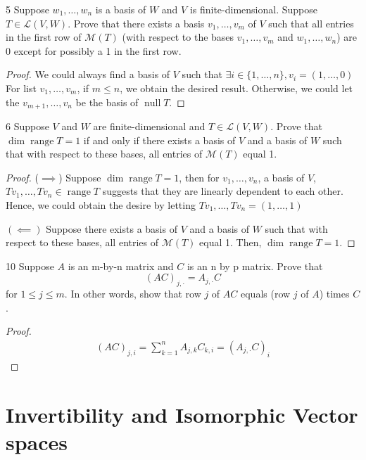 \documentclass{article}
\newenvironment{problem}[1]{\begin{prob*}{#1}{}}{\end{prob*}}
\DeclareMathOperator{\Null}{null}
\DeclareMathOperator{\Range}{range}
\begin{document}
\begin{problem}{5}
Suppose $w_1, \ldots ,w_n$ is a basis of $W$ and $V$ is finite-dimensional. Suppose $T \in \mathcal{L}(V,W)$. Prove that there exists a basis $v_1, \ldots ,v_m$ of $V$ such that all entries in the first row of $\mathcal{M}(T)$ (with respect to the bases $v_1, \ldots ,v_m$ and $w_1, \ldots ,w_n$) are 0 except for possibly a 1 in the first row.
\end{problem}
\begin{proof}
	We could always find a basis of $V$ such that $\exists i \in \{1, \ldots ,n\}, v_i = (1, \ldots ,0)$
	For list $v_1, \ldots ,v_m$, if $m \le n$, we obtain the desired result. Otherwise, we could let the $v_{m+1}, \ldots , v_n$ be the basis of $\Null T$.
\end{proof}

\begin{problem}{6}
Suppose $V$ and $W$ are finite-dimensional and $T \in \mathcal{L}(V,W)$. Prove that $\operatorname{dim}\Range T = 1$ if and only if there exists a basis of $V$ and a basis of $W$ such that with respect to these bases, all entries of $\mathcal{M}(T)$ equal 1.
\end{problem}
\begin{proof}
	($\implies$) Suppose $\operatorname{dim}\Range T = 1$, then for $v_1, \ldots ,v_n$, a basis of $V$, $Tv_1, \ldots ,Tv_n \in \Range T$ suggests that they are linearly dependent to each other. Hence, we could obtain the desire by letting $Tv_1, \ldots ,Tv_n = (1, \ldots ,1)$

	$(\impliedby)$ Suppose there exists a basis of $V$ and a basis of $W$ such that with respect to these bases, all entries of $\mathcal{M}(T)$ equal 1. Then, $\operatorname{dim}\Range T = 1$.
\end{proof}

\begin{problem}{10}
Suppose $A$ is an m-by-n matrix and $C $ is an n by p matrix. Prove that \[
	(AC)_{j,\cdot} = A_{j, \cdot }C\]
for $1 \le j \le m$. In other words, show that row $j$ of $AC$ equals (row $j$ of $A$) times $C$.
\end{problem}
\begin{proof}
	\begin{align}
		(AC)_{j,i} = \sum_{k=1}^n A_{j,k}C_{k,i} = (A_{j, \cdot}C)_{i}
	\end{align}
\end{proof}

\newpage

\section{Invertibility and Isomorphic Vector spaces}
\end{document}
